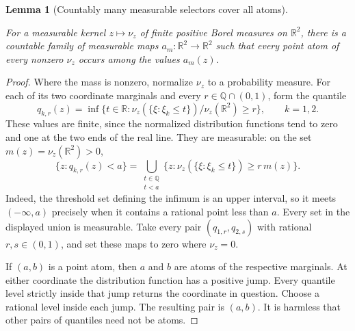 \documentclass[11pt]{amsart}
\newcommand{\R}{\mathbb R}
\newcommand{\Q}{\mathbb Q}
\newtheorem{lemma}[theorem]{Lemma}
\theoremstyle{definition}
\theoremstyle{remark}
\numberwithin{equation}{section}
\providecommand{\lean}[1]{}
\providecommand{\leanok}{}
\begin{document}
\begin{lemma}[Countably many measurable selectors cover all atoms]
\label{ann:selectors}
\lean{Auto.ann_selectors}
\leanok
For a measurable kernel $z\mapsto\nu_z$ of finite positive Borel
measures on $\R^2$, there is a countable family of measurable maps
$a_m:\R^2\to\R^2$ such that every point atom of every nonzero
$\nu_z$ occurs among the values $a_m(z)$.
\end{lemma}
\begin{proof}
Where the mass is nonzero, normalize $\nu_z$ to a probability
measure. For each of its two coordinate marginals and every
$r\in\mathbb Q\cap(0,1)$, form the quantile
\[
 q_{k,r}(z)=\inf\{t\in\R:
 \nu_z(\{\xi:\xi_k\le t\})/\nu_z(\R^2)\ge r\},
 \qquad k=1,2.
\]
These values are finite, since the normalized distribution functions
tend to zero and one at the two ends of the real line.
They are measurable: on the set $m(z)=\nu_z(\R^2)>0$,
\[
 \{z:q_{k,r}(z)<a\}
 =\bigcup_{\substack{t\in\Q\\t<a}}
   \{z:\nu_z(\{\xi:\xi_k\le t\})\ge r\,m(z)\}.
\]
Indeed, the threshold set defining the infimum is an upper interval,
so it meets $(-\infty,a)$ precisely when it contains a rational point
less than $a$.  Every set in the displayed union is measurable.
Take every pair $(q_{1,r},q_{2,s})$ with rational $r,s\in(0,1)$,
and set these maps to zero where $\nu_z=0$.

If $(a,b)$ is a point atom, then $a$ and $b$ are atoms of the
respective marginals. At either coordinate the distribution
function has a positive jump. Every quantile level strictly
inside that jump returns the coordinate in question. Choose a
rational level inside each jump. The resulting pair is $(a,b)$.
It is harmless that other pairs of quantiles need not be atoms.
\end{proof}
\end{document}
